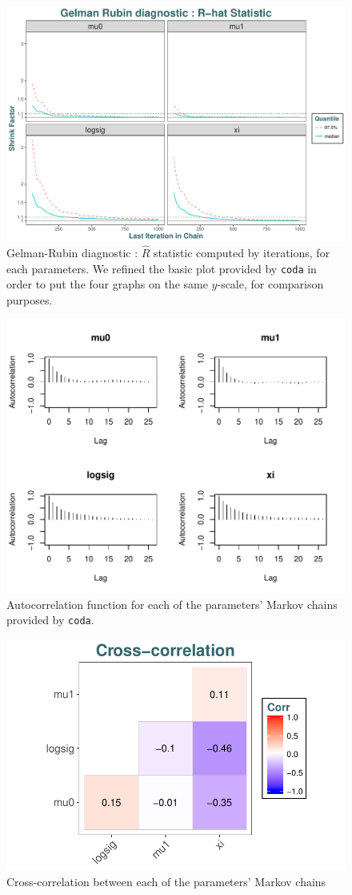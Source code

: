 \begin{figure}[!htb]
	\centering	\includegraphics[width=0.7\linewidth]{gelmdiag.pdf}\caption{Gelman-Rubin diagnostic : $\hat{R}$ statistic computed by iterations, for each parameters. We refined the basic plot provided by \texttt{coda} in order to put the four graphs on the same $y$-scale, for comparison purposes.}\label{fig:gelmdiag}
\end{figure}


\begin{figure}[!htb]
	\centering	\includegraphics[width=0.8\linewidth]{autocor.pdf}\caption{Autocorrelation function for each of the parameters' Markov chains provided by \texttt{coda}. }\label{fig:autocor}
\end{figure}

\begin{figure}[!htb]
	\centering	\includegraphics[width=0.5\linewidth]{crosscorr.pdf}\caption{Cross-correlation between each of the parameters' Markov chains}\label{fig:crosscorr}
\end{figure}


